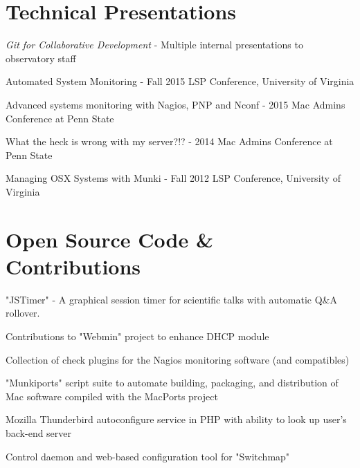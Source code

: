 \documentclass[letterpaper]{deedy-resume-openfont}
\begin{document}
\section{Technical Presentations}
\begin{tightemize}
\vspace{8pt}
\item \textit{Git for Collaborative Development} - Multiple internal presentations to observatory staff
\item Automated System Monitoring - Fall 2015 LSP Conference, University of Virginia \\
\item Advanced systems monitoring with Nagios, PNP and Nconf - 2015 Mac Admins Conference at Penn State \\
\item What the heck is wrong with my server?!? - 2014 Mac Admins Conference at Penn State \\
\item Managing OSX Systems with Munki - Fall 2012 LSP Conference, University of
Virginia \\
\end{tightemize}

\vspace{20pt}
\section{Open Source Code \& Contributions}
\vspace{8pt}
\begin{tightemize}
	\item "JSTimer" - A graphical session timer for scientific talks with automatic Q\&A rollover.
	\item Contributions to "Webmin" project to enhance DHCP module
	\item Collection of check plugins for the Nagios monitoring software (and compatibles)
	\item "Munkiports" script suite to automate building, packaging, and distribution of Mac software compiled with the MacPorts project
	\item Mozilla Thunderbird autoconfigure service in PHP with ability to look up user's back-end server
	\item Control daemon and web-based configuration tool for "Switchmap"
\end{tightemize}
\end{document}
